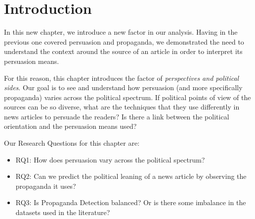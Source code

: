 \label{chap:political_sides}


% 

\section{\statusgreen Introduction}


In this new chapter, we introduce a new factor in our analysis.
Having in the previous one covered persuasion and propaganda, we demonstrated the need to understand the context around the source of an article in order to interpret its persuasion means.

For this reason, this chapter introduces the factor of \emph{perspectives and political sides}.
Our goal is to see and understand how persuasion (and more specifically propaganda) varies across the political spectrum. If political points of view of the sources can be so diverse, what are the techniques that they use differently in news articles to persuade the readers? Is there a link between the political orientation and the persuasion means used?


Our Research Questions for this chapter are:
\begin{itemize}
    \item RQ1: How does persuasion vary across the political spectrum?
    \item RQ2: Can we predict the political leaning of a news article by observing the propaganda it uses?
    \item RQ3: Is Propaganda Detection balanced? Or is there some imbalance in the datasets used in the literature?
\end{itemize}

